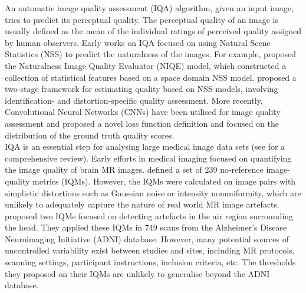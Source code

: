 \documentclass[preprint,12pt,authoryear]{elsarticle}
\begin{document}
An automatic image quality assessment (IQA) algorithm, given an input image, tries to predict its perceptual quality. The perceptual quality of an image is usually defined as the mean of the individual ratings of perceived quality assigned by human observers.
Early works on IQA focused on using Natural Scene Statistics (NSS) to predict the naturalness of the images. For example, \cite{Mittal2013} proposed the Naturalness Image Quality Evaluator (NIQE) model, which constructed a collection of statistical features based on a space domain NSS model.  
\cite{Moorthy2011} proposed a two-stage framework for estimating quality based on NSS models, involving identification- and distortion-specific quality assessment. More recently, Convolutional Neural Networks (CNNs) have been utilised for image quality assessment \citep{Kang2014} and \cite{Talebi2018} proposed a novel loss function definition and focused on the distribution of the ground truth quality scores.\\


IQA is an essential step for analysing large medical image data sets (see \cite{Chow2016} for a comprehensive review). Early efforts in medical imaging focused on quantifying the image quality of brain MR images. \cite{Woodard2006} defined a set of 239 no-reference image-quality metrics (IQMs). However, the IQMs were calculated on image pairs with simplistic distortions such as Gaussian  noise  or  intensity  nonuniformity, which are unlikely to adequately capture the nature of real world MR image artefacts. \cite{Mortamet2009}  proposed two IQMs focused on detecting artefacts in the air region surrounding the head. They applied these IQMs in 749 scans from the Alzheimer’s Disease Neuroimaging Initiative (ADNI) database. However, many potential sources of uncontrolled variability exist between studies and sites, including MR protocols, scanning settings, participant instructions, inclusion criteria, etc. The thresholds they proposed on their IQMs are unlikely to generalise beyond the ADNI database.\\
\end{document}
